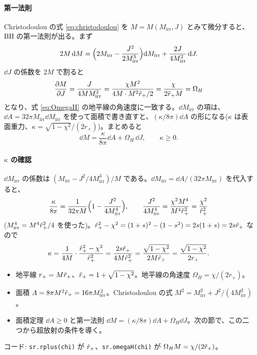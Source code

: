 \paragraph{第一法則}
Christodoulou の式 \eqref{eq:christodoulou} を $M=M(M_\mathrm{irr},J)$ とみて微分すると、BH の第一法則が出る。まず
\begin{equation}
2M\,\mathrm{d} M=\Bigl(2M_\mathrm{irr}-\frac{J^2}{2M_\mathrm{irr}^3}\Bigr)\mathrm{d} M_\mathrm{irr}+\frac{2J}{4M_\mathrm{irr}^2}\,\mathrm{d} J.
\end{equation}
$\dd J$ の係数を $2M$ で割ると
\begin{equation}
\frac{\partial M}{\partial J}=\frac{J}{4MM_\mathrm{irr}^2}=\frac{\chi M^2}{4M\cdot M^2\tilde r_+/2}=\frac{\chi}{2\tilde r_+ M}=\Omega_H
\end{equation}
となり、式 \eqref{eq:OmegaH} の地平線の角速度に一致する。$\dd M_\mathrm{irr}$ の項は、$\dd A=32\pi M_\mathrm{irr}\dd M_\mathrm{irr}$ を使って面積で書き直すと、$(\kappa/8\pi)\dd A$ の形になる($\kappa$ は表面重力、$\kappa=\sqrt{1-\chi^2}/(2r_+)$)。まとめると
\begin{equation}
\dd M=\frac{\kappa}{8\pi}\dd A+\Omega_H\,\dd J,\qquad \kappa\ge0.
\label{eq:firstlaw}
\end{equation}

\paragraph{$\kappa$ の確認}
$\dd M_\mathrm{irr}$ の係数は $(M_\mathrm{irr}-J^2/4M_\mathrm{irr}^3)/M$ である。$\dd M_\mathrm{irr}=\dd A/(32\pi M_\mathrm{irr})$ を代入すると、
\[
\frac{\kappa}{8\pi}=\frac{1}{32\pi M}\Bigl(1-\frac{J^2}{4M_\mathrm{irr}^4}\Bigr),\qquad
\frac{J^2}{4M_\mathrm{irr}^4}=\frac{\chi^2M^4}{M^4\tilde r_+^2}=\frac{\chi^2}{\tilde r_+^2}
\]
($M_\mathrm{irr}^4=M^4\tilde r_+^2/4$ を使った)。$\tilde r_+^2-\chi^2=(1+s)^2-(1-s^2)=2s(1+s)=2s\tilde r_+$ なので
\[
\kappa=\frac{1}{4M}\cdot\frac{\tilde r_+^2-\chi^2}{\tilde r_+^2}=\frac{2s\tilde r_+}{4M\tilde r_+^2}=\frac{\sqrt{1-\chi^2}}{2M\tilde r_+}=\frac{\sqrt{1-\chi^2}}{2r_+}.
\]

\begin{summary}
\begin{itemize}
\item 地平線 $r_+=M\tilde r_+$、$\tilde r_+=1+\sqrt{1-\chi^2}$。地平線の角速度 $\Omega_H=\chi/(2r_+)$。
\item 面積 $A=8\pi M^2\tilde r_+=16\pi M_\mathrm{irr}^2$。Christodoulou の式 $M^2=M_\mathrm{irr}^2+J^2/(4M_\mathrm{irr}^2)$。
\item 面積定理 $\dd A\ge0$ と第一法則 $\dd M=(\kappa/8\pi)\dd A+\Omega_H\dd J$。次の節で、この二つから超放射の条件を導く。
\end{itemize}
\end{summary}

\begin{tocode}
コード: \texttt{sr.rplus(chi)} が $\tilde r_+$、\texttt{sr.omegaH(chi)} が $\Omega_HM=\chi/(2\tilde r_+)$。
\end{tocode}
